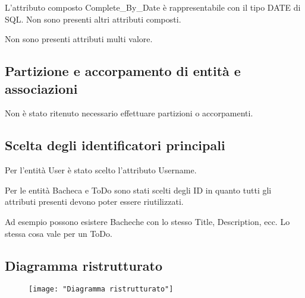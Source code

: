 \documentclass{article}
\begin{document}
		L'attributo composto Complete{\_}By{\_}Date è rappresentabile con il tipo DATE di SQL.
		Non sono presenti altri attributi composti. \linebreak[2]
		
		Non sono presenti attributi multi valore. \linebreak[2]
		
		\subsection{Partizione e accorpamento di entità e associazioni}
		
		Non è stato ritenuto necessario effettuare partizioni o accorpamenti.
		
		\subsection{Scelta degli identificatori principali}
		
		Per l'entità User è stato scelto l'attributo Username.
		
		Per le entità Bacheca e ToDo sono stati scelti degli ID in quanto tutti gli attributi presenti devono poter essere riutilizzati.
		
		Ad esempio possono esistere Bacheche con lo stesso Title, Description, ecc. Lo stessa cosa vale per un ToDo.
		
		\subsection{Diagramma ristrutturato}	
		
		\begin{figure}[H]
			\centering
			\texttt{[image: "Diagramma ristrutturato"]}
			\label{fig:diagramma-ristrutturato}
		\end{figure}
		\pagebreak
		
\end{document}
